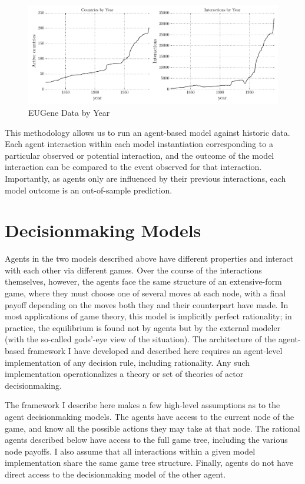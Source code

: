 \begin{figure}[h!]
    \centering
	\includegraphics[width=\textwidth]{WarReason/Figures/DataByYear}
    \caption{EUGene Data by Year}
    \label{fig:data_by_year}
    \figSpace
\end{figure}


This methodology allows us to run an agent-based model against historic data. Each agent interaction within each model instantiation corresponding to a particular observed or potential interaction, and the outcome of the model interaction can be compared to the event observed for that interaction. Importantly, as agents only are influenced by their previous interactions, each model outcome is an out-of-sample prediction.

\section{Decisionmaking Models} \label{decisionmaking_models}

Agents in the two models described above have different properties and interact with each other via different games. Over the course of the interactions themselves, however, the agents face the same structure of an extensive-form game, where they must choose one of several moves at each node, with a final payoff depending on the moves both they and their counterpart have made. In most applications of game theory, this model is implicitly perfect rationality; in practice, the equilibrium is found not by agents but by the external modeler (with the so-called gods'-eye view of the situation). The architecture of the agent-based framework I have developed and described here requires an agent-level implementation of any decision rule, including rationality. Any such implementation operationalizes a theory or set of theories of actor decisionmaking.

The framework I describe here makes a few high-level assumptions as to the agent decisionmaking models. The agents have access to the current node of the game, and know all the possible actions they may take at that node. The rational agents described below have access to the full game tree, including the various node payoffs. I also assume that all interactions within a given model implementation share the same game tree structure. Finally, agents do not have direct access to the decisionmaking model of the other agent.

